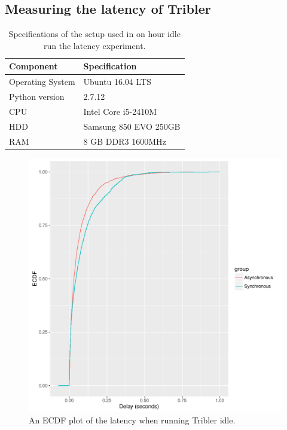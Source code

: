 \subsection{Measuring the latency of Tribler}

\begin{table}[h]
	\centering
	\caption{Specifications of the setup used in on hour idle run the latency experiment.}
	\label{table:specs_hp_elitebook}
	\begin{tabular}{l|l}
		\hline
		\textbf{Component}	& \textbf{Specification} \\ \hline
		Operating System   	& Ubuntu 16.04 LTS \\
		Python version		& 2.7.12 \\
		CPU					& Intel Core i5-2410M \\ 
		HDD					& Samsung 850 EVO 250GB  \\ 
		RAM					& 8 GB DDR3 1600MHz \\
	\end{tabular}
\end{table}

\begin{figure}[!h]
	\centering
	\includegraphics[width=\linewidth]{experimentation/images/ecdf_latency_idle}
	\caption{An ECDF plot of the latency when running Tribler idle.}
	\label{fig:ecdf_latency_idle}
\end{figure} 

